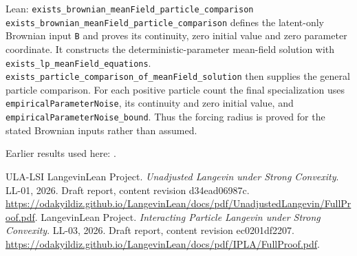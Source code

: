 \documentclass[11pt,a4paper]{article}
\begin{document}
\begin{leanbox}{Lean: \texttt{exists\_\allowbreak{}brownian\_\allowbreak{}meanField\_\allowbreak{}particle\_\allowbreak{}comparison}}
\texttt{exists\_\allowbreak{}brownian\_\allowbreak{}mean\allowbreak{}Field\_\allowbreak{}particle\_\allowbreak{}comparison} defines the latent-only Brownian input \texttt{B} and proves its continuity, zero initial value and zero parameter coordinate. It constructs the deterministic-parameter mean-field solution with \texttt{exists\_\allowbreak{}lp\_\allowbreak{}mean\allowbreak{}Field\_\allowbreak{}equations}. \texttt{exists\_\allowbreak{}particle\_\allowbreak{}comparison\_\allowbreak{}of\_\allowbreak{}mean\allowbreak{}Field\_\allowbreak{}solution} then supplies the general particle comparison. For each positive particle count the final specialization uses \texttt{empirical\allowbreak{}Parameter\allowbreak{}Noise}, its continuity and zero initial value, and \texttt{empirical\allowbreak{}Parameter\allowbreak{}Noise\_\allowbreak{}bound}. Thus the forcing radius is proved for the stated Brownian inputs rather than assumed.
\end{leanbox}


Earlier results used here: \cite[Section~3.1.1]{LangevinLean2026IPLA}.

\begin{thebibliography}{ULA-LSI}
LangevinLean Project. \emph{Unadjusted Langevin under Strong Convexity}. LL-01, 2026. Draft report, content revision d34ead06987c. \url{https://odakyildiz.github.io/LangevinLean/docs/pdf/UnadjustedLangevin/FullProof.pdf}.
LangevinLean Project. \emph{Interacting Particle Langevin under Strong Convexity}. LL-03, 2026. Draft report, content revision ec0201df2207. \url{https://odakyildiz.github.io/LangevinLean/docs/pdf/IPLA/FullProof.pdf}.
\end{thebibliography}
\end{document}
